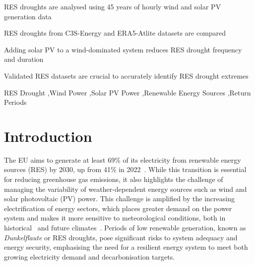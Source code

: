 \documentclass[preprint, 12pt]{elsarticle}
\begin{document}
\begin{frontmatter}
\begin{highlights}
\item RES droughts are analysed using 45 years of hourly wind and solar PV generation data

\item RES droughts from C3S-Energy and ERA5-Atlite datasets are compared

\item Adding solar PV to a wind-dominated system reduces RES drought frequency and duration

\item Validated RES datasets are crucial to accurately identify RES drought extremes

\end{highlights}

\begin{keyword}
RES Drought \sep Wind Power \sep Solar PV Power \sep Renewable Energy Sources \sep Return Periods

\end{keyword}

\end{frontmatter}

\linenumbers

\section{Introduction}
\label{sec:intro}

The EU aims to generate at least 69\% of its electricity from renewable energy sources (RES) by 2030, up from 41\% in 2022~\citep{eurostat2023share}. While this transition is essential for reducing greenhouse gas emissions, it also highlights the challenge of managing the variability of weather-dependent energy sources such as wind and solar photovoltaic (PV) power. This challenge is amplified by the increasing electrification of energy sectors, which places greater demand on the power system and makes it more sensitive to meteorological conditions, both in historical~\citep{bloomfield2016} and future climates~\citep{bloomfield2021}. Periods of low renewable generation, known as \textit{Dunkelflaute} or RES droughts, pose significant risks to system adequacy and energy security, emphasising the need for a resilient energy system to meet both growing electricity demand and decarbonisation targets.
\end{document}

